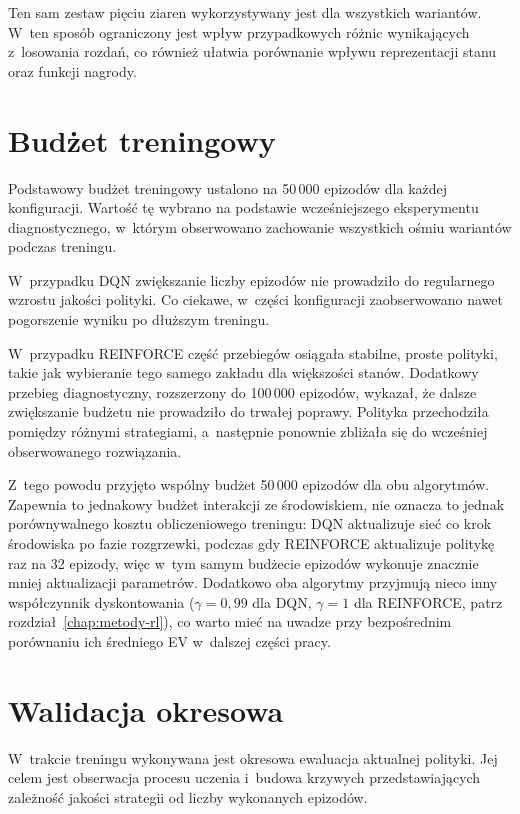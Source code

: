 Ten sam zestaw pięciu ziaren wykorzystywany jest dla wszystkich wariantów.
W~ten sposób ograniczony jest wpływ przypadkowych różnic wynikających
z~losowania rozdań, co również ułatwia porównanie wpływu reprezentacji
stanu oraz funkcji nagrody.

\section{Budżet treningowy}

Podstawowy budżet treningowy ustalono na 50\,000 epizodów dla każdej
konfiguracji. Wartość tę wybrano na podstawie wcześniejszego
eksperymentu diagnostycznego, w~którym obserwowano zachowanie
wszystkich ośmiu wariantów podczas treningu.

W~przypadku DQN zwiększanie liczby epizodów nie prowadziło do
regularnego wzrostu jakości polityki. Co ciekawe, w~części konfiguracji
zaobserwowano nawet pogorszenie wyniku po dłuższym treningu.

W~przypadku REINFORCE część przebiegów osiągała stabilne, proste
polityki, takie jak wybieranie tego samego zakładu dla większości
stanów. Dodatkowy przebieg diagnostyczny, rozszerzony do 100\,000
epizodów, wykazał, że dalsze zwiększanie budżetu nie prowadziło do
trwałej poprawy. Polityka przechodziła pomiędzy różnymi strategiami,
a~następnie ponownie zbliżała się do wcześniej obserwowanego
rozwiązania.

Z~tego powodu przyjęto wspólny budżet 50\,000 epizodów dla obu
algorytmów. Zapewnia to jednakowy budżet interakcji ze środowiskiem, nie
oznacza to jednak porównywalnego kosztu obliczeniowego treningu: DQN
aktualizuje sieć co krok środowiska po fazie rozgrzewki, podczas gdy
REINFORCE aktualizuje politykę raz na 32 epizody, więc w~tym samym
budżecie epizodów wykonuje znacznie mniej aktualizacji parametrów.
Dodatkowo oba algorytmy przyjmują nieco inny współczynnik dyskontowania
($\gamma=0{,}99$ dla DQN, $\gamma=1$ dla REINFORCE, patrz rozdział~\ref{chap:metody-rl}), co warto mieć na uwadze przy
bezpośrednim porównaniu ich średniego EV w~dalszej części pracy.

\section{Walidacja okresowa}

W~trakcie treningu wykonywana jest okresowa ewaluacja aktualnej polityki.
Jej celem jest obserwacja procesu uczenia i~budowa krzywych
przedstawiających zależność jakości strategii od liczby wykonanych
epizodów.

